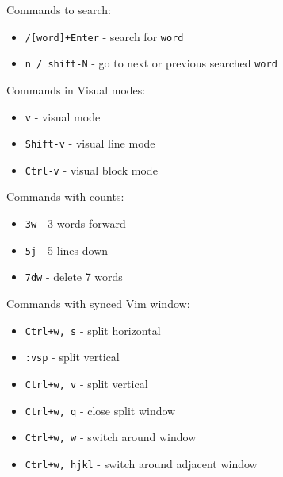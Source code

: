 Commands to search:
\begin{itemize}
	\setlength\itemsep{0em}
	\item \verb|/[word]+Enter| - search for \texttt{word}
	\item \verb|n / shift-N| - go to next or previous searched \texttt{word}
\end{itemize}

Commands in Visual modes:
\begin{itemize}
	\setlength\itemsep{0em}
	\item \verb|v| - visual mode
	\item \verb|Shift-v| - visual line mode
	\item \verb|Ctrl-v| - visual block mode
\end{itemize}

Commands with counts:
\begin{itemize}
	\setlength\itemsep{0em}
	\item \verb|3w| - 3 words forward
	\item \verb|5j| - 5 lines down
	\item \verb|7dw| - delete 7 words
\end{itemize}

Commands with synced Vim window:
\begin{itemize}
	\setlength\itemsep{0em}
	\item \verb|Ctrl+w, s| - split horizontal
	\item \verb|:vsp| - split vertical
	\item \verb|Ctrl+w, v| - split vertical
	\item \verb|Ctrl+w, q| - close split window
	\item \verb|Ctrl+w, w| - switch around window
	\item \verb|Ctrl+w, hjkl| - switch around adjacent window
\end{itemize}

\clearpage